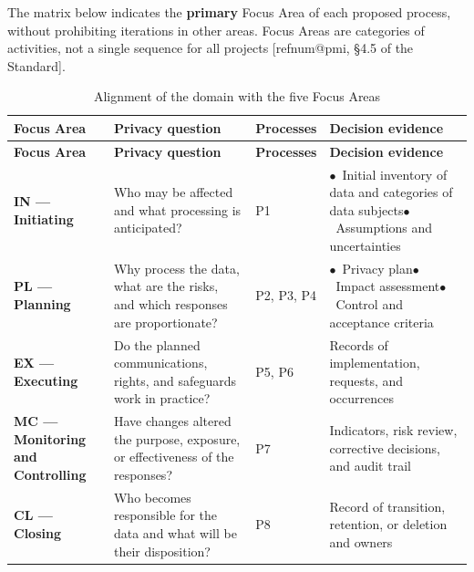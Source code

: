 \documentclass[11pt,a4paper]{article}
\makeatletter
\newcommand{\refnum}[1]{\csname refnum@#1\endcsname}
\newcommand{\SingleSpacing}{}
\newcommand{\fontetab}[1]{\par\vspace{3pt}{\small\noindent Source: #1\par}}
\makeatother
\begin{document}
The matrix below indicates the \textbf{primary} Focus Area of each proposed process, without prohibiting iterations in other areas. Focus Areas are categories of activities, not a single sequence for all projects [\refnum{pmi}, §4.5 of the Standard].

\begingroup\SingleSpacing\footnotesize
\begin{longtable}{@{}>{\raggedright\arraybackslash}p{}>{\raggedright\arraybackslash}p{}>{\raggedright\arraybackslash}p{}>{\raggedright\arraybackslash}p{}@{}}
\caption{Alignment of the domain with the five Focus Areas}\label{tab:t8}\\
\toprule
\textbf{Focus Area} & \textbf{Privacy question} & \textbf{Processes} & \textbf{Decision evidence}\\
\midrule
\endfirsthead
\toprule
\textbf{Focus Area} & \textbf{Privacy question} & \textbf{Processes} & \textbf{Decision evidence}\\
\midrule
\endhead
\bottomrule
\endfoot
\bottomrule
\endlastfoot
\textbf{IN — Initiating} & Who may be affected and what processing is anticipated? & P1 & $\bullet$~Initial inventory of data and categories of data subjects\newline$\bullet$~Assumptions and uncertainties\\[3pt]
\textbf{PL — Planning} & Why process the data, what are the risks, and which responses are proportionate? & P2, P3, P4 & $\bullet$~Privacy plan\newline$\bullet$~Impact assessment\newline$\bullet$~Control and acceptance criteria\\[3pt]
\textbf{EX — Executing} & Do the planned communications, rights, and safeguards work in practice? & P5, P6 & Records of implementation, requests, and occurrences\\[3pt]
\textbf{MC — Monitoring and Controlling} & Have changes altered the purpose, exposure, or effectiveness of the responses? & P7 & Indicators, risk review, corrective decisions, and audit trail\\[3pt]
\textbf{CL — Closing} & Who becomes responsible for the data and what will be their disposition? & P8 & Record of transition, retention, or deletion and owners\\[3pt]
\end{longtable}
\endgroup
\fontetab{Prepared by the authors (2026).}
\end{document}
